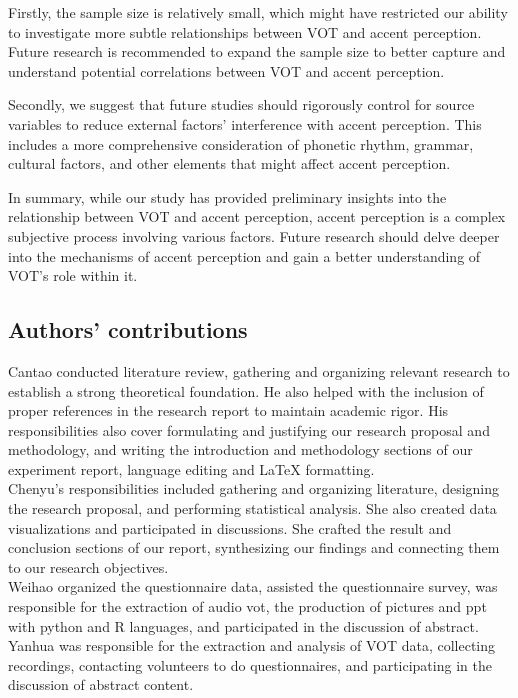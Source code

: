 \documentclass[runningheads]{llncs}
\begin{document}
Firstly, the sample size is relatively small, which might have restricted our ability to investigate more subtle relationships between VOT and accent perception. Future research is recommended to expand the sample size to better capture and understand potential correlations between VOT and accent perception.

Secondly, we suggest that future studies should rigorously control for source variables to reduce external factors' interference with accent perception. This includes a more comprehensive consideration of phonetic rhythm, grammar, cultural factors, and other elements that might affect accent perception.

In summary, while our study has provided preliminary insights into the relationship between VOT and accent perception, accent perception is a complex subjective process involving various factors. Future research should delve deeper into the mechanisms of accent perception and gain a better understanding of VOT's role within it.



\subsection*{Authors' contributions}
Cantao conducted literature review, gathering and organizing relevant research to establish a strong theoretical foundation. He also helped with the inclusion of proper references in the research report to maintain academic rigor. His responsibilities also cover formulating and justifying our research proposal and methodology, and writing the introduction and methodology sections of our experiment report,  language editing and LaTeX formatting. \\
Chenyu's responsibilities included gathering and organizing literature, designing the research proposal, and performing statistical analysis. She also created data visualizations and participated in discussions. She crafted the result and conclusion sections of our report, synthesizing our findings and connecting them to our research objectives. \\
Weihao organized the questionnaire data, assisted the questionnaire survey, was responsible for the extraction of audio vot, the production of pictures and ppt with python and R languages, and participated in the discussion of abstract.\\
Yanhua was responsible for the extraction and analysis of VOT data, collecting recordings, contacting volunteers to do questionnaires, and participating in the discussion of abstract content.
%
%
%


%
\end{document}
